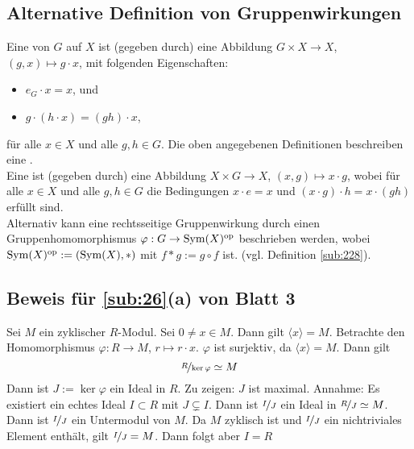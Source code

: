 \subsection{Alternative Definition von Gruppenwirkungen} %
\label{sub:anh_1}
Eine  von $G$ auf $X$ ist (gegeben durch) eine Abbildung $G\times X \to X$, $(g,x)\mapsto g\cdot x$, mit folgenden Eigenschaften:
\begin{itemize}
	\item $e_G \cdot x= x$, und
	\item $g\cdot(h\cdot x)=(gh)\cdot x$,
\end{itemize}
für alle $x \in X$ und alle $g,h\in G$.
Die oben angegebenen Definitionen beschreiben eine .\\
Eine  ist (gegeben durch) eine Abbildung $X\times G \to X$, $(x,g)\mapsto x\cdot g$, 
wobei für alle $x\in X$ und alle $g,h\in G$ die Bedingungen $x\cdot e=x$ und $(x\cdot g) \cdot h =x \cdot (gh)$ erfüllt sind.\\
Alternativ kann eine rechtsseitige Gruppenwirkung durch einen Gruppenhomomorphismus $\varphi : G \to \operatorname{Sym}(X)^{\mathrm{op}}$ beschrieben werden, 
wobei $\operatorname{Sym}(X)^{\mathrm{op}}:=(\operatorname{Sym}(X),*)$ mit $f*g:=g\circ f$ ist. (vgl. Definition \ref{sub:228}).

\subsection{Beweis für \ref{sub:26}(a) von Blatt 3} %
\label{sub:anh_2}
Sei $M$ ein zyklischer $R$-Modul. Sei $0 \not= x \in M$. Dann gilt $\langle x \rangle = M$. Betrachte den Homomorphismus $\varphi : R \to M$, $r \mapsto r \cdot x$.
$\varphi$ ist surjektiv, da $\langle x \rangle= M$. Dann gilt
\[
	\nicefrac{R}{\ker \varphi} \simeq M
\]
Dann ist $J := \ker \varphi$ ein Ideal in $R$. Zu zeigen: $J$ ist maximal. Annahme: Es existiert ein echtes Ideal $I \subset R$ mit $J \subsetneq I$. Dann ist 
$\nicefrac{I}{J}$ ein Ideal in $\nicefrac{R}{J} \simeq M$. Dann ist $\nicefrac{I}{J}$ ein Untermodul von $M$. Da $M$ zyklisch ist und $\nicefrac{I}{J}$ ein nichtriviales 
Element enthält, gilt $\nicefrac{I}{J}=M$. Dann folgt aber $I=R$ \light \bewende
\newpage
{}
\setcounter{page}{1}

\printindex
\listoffigures
\todototoc
{}

